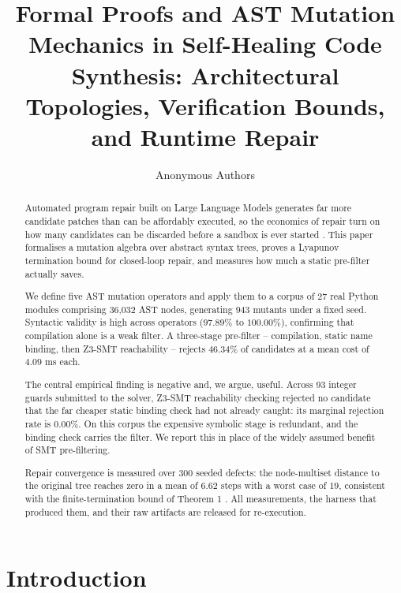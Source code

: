 \documentclass{article}
\begin{document}
\title{Formal Proofs and AST Mutation Mechanics in Self-Healing Code Synthesis: Architectural Topologies, Verification Bounds, and Runtime Repair}
\author{Anonymous Authors}
\maketitle

\begin{abstract}
Automated program repair built on Large Language Models generates far more candidate patches than can be affordably executed, so the economics of repair turn on how many candidates can be discarded before a sandbox is ever started \cite{arxiv_2405_01543,arxiv_2010_11146}. This paper formalises a mutation algebra over abstract syntax trees, proves a Lyapunov termination bound for closed-loop repair, and measures how much a static pre-filter actually saves.

We define five AST mutation operators and apply them to a corpus of 27 real Python modules comprising 36{,}032 AST nodes, generating 943 mutants under a fixed seed. Syntactic validity is high across operators ($97.89\%$ to $100.00\%$), confirming that compilation alone is a weak filter. A three-stage pre-filter -- compilation, static name binding, then Z3-SMT reachability -- rejects $46.34\%$ of candidates at a mean cost of $4.09$ ms each.

The central empirical finding is negative and, we argue, useful. Across 93 integer guards submitted to the solver, Z3-SMT reachability checking rejected no candidate that the far cheaper static binding check had not already caught: its marginal rejection rate is $0.00\%$. On this corpus the expensive symbolic stage is redundant, and the binding check carries the filter. We report this in place of the widely assumed benefit of SMT pre-filtering.

Repair convergence is measured over 300 seeded defects: the node-multiset distance to the original tree reaches zero in a mean of $6.62$ steps with a worst case of $19$, consistent with the finite-termination bound of Theorem 1 \cite{arxiv_2501_02497}. All measurements, the harness that produced them, and their raw artifacts are released for re-execution.
\end{abstract}






\section{Introduction}
\end{document}
